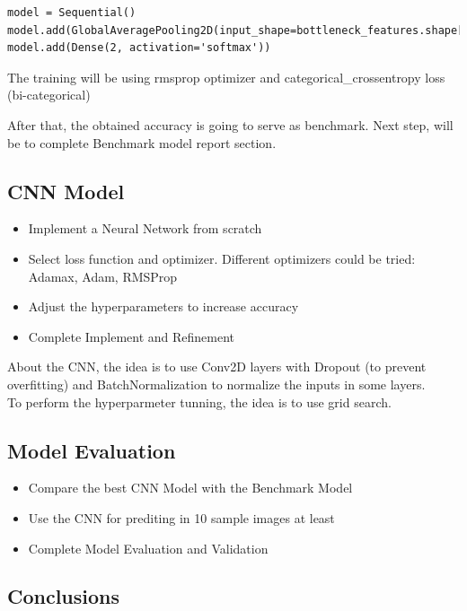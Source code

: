 \documentclass[a4paper,10pt]{article}
\begin{document}
\begin{lstlisting}
model = Sequential()
model.add(GlobalAveragePooling2D(input_shape=bottleneck_features.shape[1:]))
model.add(Dense(2, activation='softmax'))
\end{lstlisting}

The training will be using rmsprop optimizer and categorical\_crossentropy loss (bi-categorical) 

After that, the obtained accuracy is going to serve as benchmark. Next step, will be to complete Benchmark model report section.

\subsection{CNN Model}

\begin{itemize}
\item Implement a Neural Network from scratch
\item Select loss function and optimizer. Different optimizers could be tried: Adamax, Adam, RMSProp
\item Adjust the hyperparameters to increase accuracy
\item Complete Implement and Refinement
\end{itemize}

About the CNN, the idea is to use Conv2D layers with Dropout (to prevent overfitting) and BatchNormalization to normalize the inputs in some layers. \\

To perform the hyperparmeter tunning, the idea is to use grid search. \\ 
 
\subsection{Model Evaluation}

\begin{itemize}
\item Compare the best CNN Model with the Benchmark Model
\item Use the CNN for prediting in 10 sample images at least
\item Complete Model Evaluation and Validation
\end{itemize}

\subsection{Conclusions}
\end{document}
